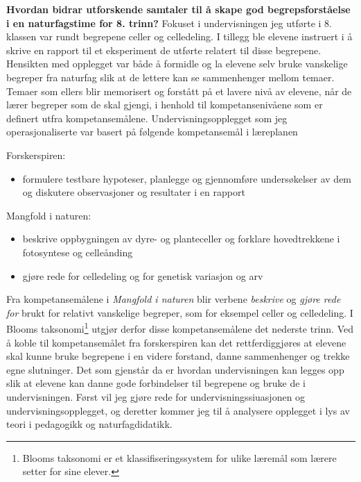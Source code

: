 \documentclass[main.tex]{subfiles}
\begin{document}
\newline
\newline
\textbf{Hvordan bidrar utforskende samtaler til å skape god begrepsforståelse i en naturfagstime 
for 8. trinn?}
\newline
\newline
Fokuset i undervisningen jeg utførte i 8. klassen var rundt begrepene celler og celledeling. 
I tillegg ble elevene instruert i å skrive en rapport til et eksperiment de utførte relatert 
til disse begrepene. Hensikten med opplegget var både å formidle og la elevene selv bruke vanskelige 
begreper fra naturfag slik at de lettere kan se sammenhenger mellom temaer. Temaer som ellers
blir memorisert og forstått på et lavere nivå av elevene, når de lærer begreper som de skal
gjengi, i henhold til kompetansenivåene som er definert utfra kompetansemålene.
\newline
\newline
Undervisningsopplegget som jeg operasjonaliserte var basert på følgende kompetansemål i 
læreplanen
\begin{displayquote}
Forskerspiren:
\begin{itemize}
\vspace{-2mm}
\item formulere testbare hypoteser, planlegge og gjennomføre undersøkelser 
av dem og diskutere observasjoner og resultater i en rapport
\end{itemize}
Mangfold i naturen:
\begin{itemize}
\vspace{-2mm}
\item beskrive oppbygningen av dyre- og planteceller og forklare hovedtrekkene i fotosyntese 
og celleånding
\vspace{-2mm}
\item gjøre rede for celledeling og for genetisk variasjon og arv
\end{itemize}
\end{displayquote} 
Fra kompetansemålene i \emph{Mangfold i naturen} blir verbene \emph{beskrive} og \emph{gjøre rede 
for} brukt for relativt vanskelige begreper, som for eksempel celler og celledeling. I Blooms 
taksonomi\footnote[1]{Blooms taksonomi er et klassifiseringssystem for ulike læremål som lærere 
setter for sine elever.} utgjør derfor disse kompetansemålene det nederste trinn. Ved å koble til 
kompetansemålet fra forskerspiren kan det rettferdiggjøres at elevene skal kunne bruke begrepene 
i en videre forstand, danne sammenhenger og trekke egne slutninger. Det som gjenstår da er hvordan 
undervisningen kan legges opp slik at elevene kan danne gode forbindelser til begrepene og bruke 
de i undervisningen. Først vil jeg gjøre rede for undervisningssiuasjonen og undervisningsopplegget, 
og deretter kommer jeg til å analysere opplegget i lys av teori i pedagogikk og naturfagdidatikk.
\end{document}
